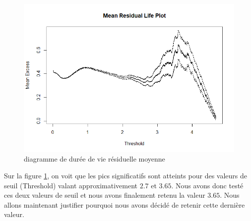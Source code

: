 \documentclass[a4paper,french,10pt]{article}
\begin{document}
\begin{figure}[htp] 
	\centering
	\includegraphics[scale=0.45]{images/res_mean.png}
	\caption{diagramme de durée de vie résiduelle moyenne}
	\label{mean_res}
\end{figure}
Sur la figure \ref{mean_res}, on voit que les pics significatifs sont atteints pour des valeurs de seuil (Threshold) valant approximativement $2.7$ et $3.65$. Nous avons donc testé ces deux valeurs de seuil et nous avons finalement retenu la valeur $3.65$. Nous allons maintenant justifier pourquoi nous avons décidé de retenir cette dernière valeur.
\end{document}
